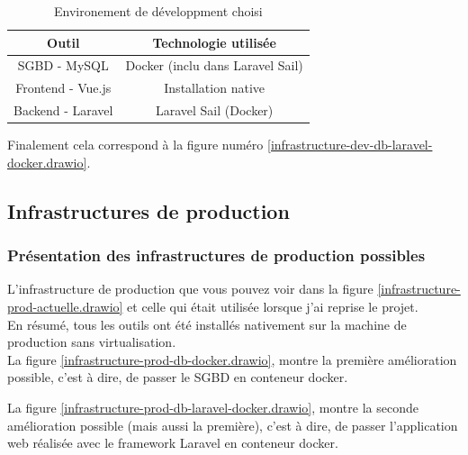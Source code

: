 \documentclass[
    iai, %
    il, %
]{heig-tb}
\begin{document}
\begin{table}[h]
    \begin{center}
        \caption{Environement de développment choisi \label{env-dev}}
        \begin{tabular}{c|c}
            Outil             & Technologie utilisée             \\ \hline
            SGBD - MySQL      & Docker (inclu dans Laravel Sail) \\
            Frontend - Vue.js & Installation native              \\
            Backend - Laravel & Laravel Sail (Docker)            \\
        \end{tabular}
    \end{center}
\end{table}

Finalement cela correspond à la figure numéro \ref{infrastructure-dev-db-laravel-docker.drawio}.

\clearpage
\subsection{Infrastructures de production}

\subsubsection{Présentation des infrastructures de production possibles}


L'infrastructure de production que vous pouvez voir dans la figure \ref{infrastructure-prod-actuelle.drawio} et celle qui était utilisée lorsque j'ai reprise le projet.\\
En résumé, tous les outils ont été installés nativement sur la machine de production sans virtualisation.\\

La figure \ref{infrastructure-prod-db-docker.drawio}, montre la première amélioration possible, c'est à dire, de passer le SGBD en conteneur docker.

La figure \ref{infrastructure-prod-db-laravel-docker.drawio}, montre la seconde amélioration possible (mais aussi la première), c'est à dire, de passer l'application web réalisée avec le framework Laravel en conteneur docker.
\end{document}
